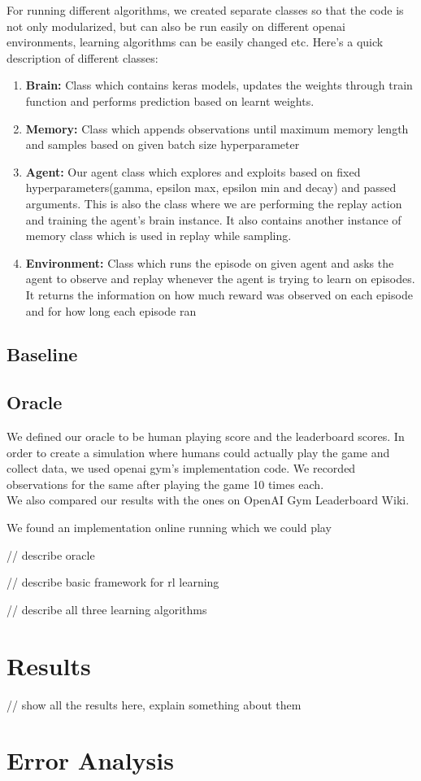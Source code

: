 \documentclass[12pt]{article}
\begin{document}
For running different algorithms, we created separate classes so that the code is not only modularized, but can also be run easily on different openai environments, learning algorithms can be easily changed etc. Here's a quick description of different classes:

\begin{enumerate}
\item \textbf{Brain:} Class which contains keras models, updates the weights through train function and performs prediction based on learnt weights. 
\item \textbf{Memory:} Class which appends observations until maximum memory length and samples based on given batch size hyperparameter
\item \textbf{Agent:} Our agent class which explores and exploits based on fixed hyperparameters(gamma, epsilon max, epsilon min and decay) and passed arguments. This is also the class where we are performing the replay action and training the agent's brain instance. It also contains another instance of memory class which is used in replay while sampling.
\item \textbf{Environment:} Class which runs the episode on given agent and asks the agent to observe and replay whenever the agent is trying to learn on episodes. It returns the information on how much reward was observed on each episode and for how long each episode ran
\end{enumerate}

\subsection{Baseline}

\subsection{Oracle}

We defined our oracle to be human playing score and the leaderboard scores. In order to create a simulation where humans could actually play the game and collect data, we used openai gym's implementation code. We recorded observations for the same after playing the game 10 times each. \\

We also compared our results with the ones on OpenAI Gym Leaderboard Wiki.

We found an implementation online running which we could play 

// describe oracle

// describe basic framework for rl learning

// describe all three learning algorithms


\section{Results}

// show all the results here, explain something about them

\section{Error Analysis}
\end{document}
